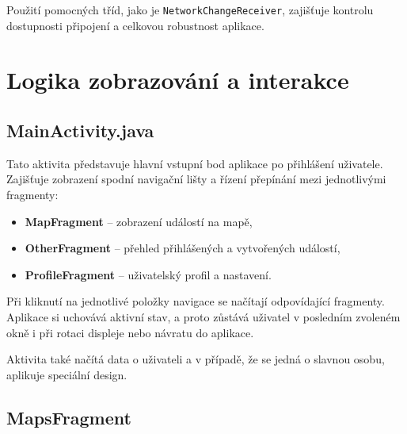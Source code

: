 Použití pomocných tříd, jako je \texttt{NetworkChangeReceiver}, zajišťuje kontrolu dostupnosti připojení a celkovou robustnost aplikace. 
\cite{JavaDocs} \cite{YouTubeTutorial} \cite{FirebaseDocs} \cite{GoogleMapAPI}  \cite{GoogleMapsAPI}



\section{Logika zobrazování a interakce}

\subsection*{MainActivity.java}

Tato aktivita představuje hlavní vstupní bod aplikace po přihlášení uživatele. Zajišťuje zobrazení spodní navigační lišty a řízení přepínání mezi jednotlivými fragmenty:

\begin{itemize}
    \item \textbf{MapFragment} – zobrazení událostí na mapě,
    \item \textbf{OtherFragment} – přehled přihlášených a vytvořených událostí,
    \item \textbf{ProfileFragment} – uživatelský profil a nastavení.
\end{itemize}

Při kliknutí na jednotlivé položky navigace se načítají odpovídající fragmenty. Aplikace si uchovává aktivní stav, a proto zůstává uživatel v posledním zvoleném okně i při rotaci displeje nebo návratu do aplikace.

Aktivita také načítá data o uživateli a v případě, že se jedná o slavnou osobu, aplikuje speciální design.





\subsection*{MapsFragment}

